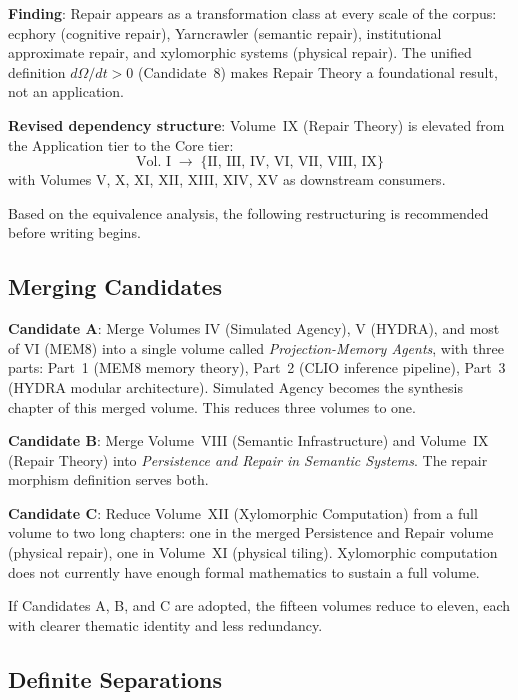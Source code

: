 \documentclass[11pt, a4paper]{article}
\begin{document}
\begin{notebox}
\textbf{Finding}: Repair appears as a transformation class at every
scale of the corpus: ecphory (cognitive repair), Yarncrawler (semantic
repair), institutional approximate repair, and xylomorphic systems
(physical repair). The unified definition $d\Omega/dt > 0$ (Candidate~8)
makes Repair Theory a foundational result, not an application.

\medskip
\textbf{Revised dependency structure}: Volume~IX (Repair Theory) is
elevated from the Application tier to the Core tier:
\[
  \text{Vol.~I}
  \;\to\;
  \{\text{II, III, IV, VI, VII, VIII, IX}\}
\]
with Volumes V, X, XI, XII, XIII, XIV, XV as downstream consumers.
\end{notebox}



Based on the equivalence analysis, the following restructuring is
recommended before writing begins.

\subsection{Merging Candidates}

\textbf{Candidate A}: Merge Volumes IV (Simulated Agency), V (HYDRA),
and most of VI (MEM\textbar{}8) into a single volume called
\emph{Projection-Memory Agents}, with three parts:
Part~1 (MEM\textbar{}8 memory theory), Part~2 (CLIO inference
pipeline), Part~3 (HYDRA modular architecture). Simulated Agency
becomes the synthesis chapter of this merged volume. This reduces
three volumes to one.

\medskip
\textbf{Candidate B}: Merge Volume~VIII (Semantic Infrastructure)
and Volume~IX (Repair Theory) into \emph{Persistence and Repair
in Semantic Systems}. The repair morphism definition serves both.

\medskip
\textbf{Candidate C}: Reduce Volume~XII (Xylomorphic Computation)
from a full volume to two long chapters: one in the merged
Persistence and Repair volume (physical repair), one in Volume~XI
(physical tiling). Xylomorphic computation does not currently have
enough formal mathematics to sustain a full volume.

\medskip
If Candidates A, B, and C are adopted, the fifteen volumes reduce to
eleven, each with clearer thematic identity and less redundancy.

\subsection{Definite Separations}
\end{document}
